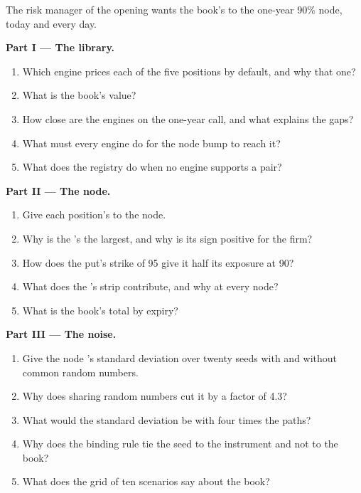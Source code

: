 \begin{problem}\label{pb:dv:build-a-pricing-library:1}
The risk manager of the opening wants the book's  to the one-year 90\% node, today and every day.

\medskip\noindent\textbf{Part I --- The library.}
\begin{enumerate}
\item Which engine prices each of the five positions by default, and why that one?
\item What is the book's value?
\item How close are the engines on the one-year call, and what explains the gaps?
\item What must every engine do for the node bump to reach it?
\item What does the registry do when no engine supports a pair?
\end{enumerate}

\medskip\noindent\textbf{Part II --- The node.}
\begin{enumerate}[resume]
\item Give each position's  to the node.
\item Why is the 's the largest, and why is its sign positive for the firm?
\item How does the put's strike of 95 give it half its exposure at 90?
\item What does the 's strip contribute, and why at every node?
\item What is the book's total  by expiry?
\end{enumerate}

\medskip\noindent\textbf{Part III --- The noise.}
\begin{enumerate}[resume]
\item Give the node 's standard deviation over twenty seeds with and without common random numbers.
\item Why does sharing random numbers cut it by a factor of 4.3?
\item What would the standard deviation be with four times the paths?
\item Why does the binding rule tie the seed to the instrument and not to the book?
\item What does the grid of ten scenarios say about the book?
\end{enumerate}


\end{problem}
